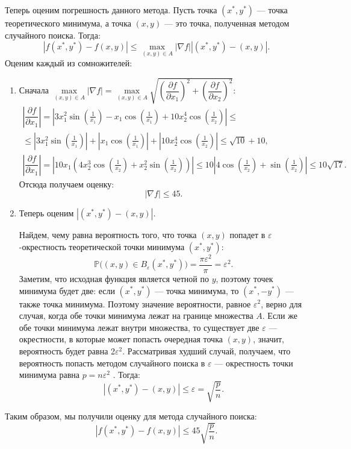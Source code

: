 \documentclass[oneside, final, 12pt]{article}
\begin{document}
	Теперь оценим погрешность данного метода. Пусть точка $(x^*, y^*)$ --- точка теоретического минимума,
	а точка $(x,y)$ --- это точка, полученная методом случайного поиска. Тогда:
	$$
		|f(x^*,y^*) - f(x,y)| \leqslant \max \limits_{(x,y)\in A}|\nabla f||(x^*,y^*) - (x,y)|.
	$$ 
	\newpage
	Оценим каждый из сомножителей:
	\begin{enumerate}
		\item Сначала $\max \limits_{(x,y)\in A}|\nabla f| =\max\limits_{(x,y)\in A} 
																				\sqrt{\left(\dfrac{\partial f}{\partial x_1}\right)^2 +
																							\left(\dfrac{\partial f}{\partial x_2}\right)^2}:$
				$$
					\begin{gathered}
						\left| \dfrac{\partial f}{\partial x_1}\right| =
					 		\left| 3x_1^2\sin\left(\frac{1}{x_1}\right)- x_1\cos\left(\frac{1}{x_1}\right)
					 					+ 10 x_2^4\cos\left(\frac{1}{x_2}\right) \right| \leqslant\\
					 		\leqslant \left| 3x_1^2\sin\left(\frac{1}{x_1}\right)\right| 
					 							+ \left|x_1\cos\left(\frac{1}{x_1}\right)\right|
					 							+ \left|10 x_2^4\cos\left(\frac{1}{x_2}\right) \right| \leqslant \sqrt{10} + 10, \\
					 	\left| \dfrac{\partial f}{\partial x_1}\right| = 
					 		\left| 10x_1\left(4x_2^3\cos\left(\frac{1}{x_2}\right)
					 				+x_2^2\sin\left(\frac{1}{x_2}\right) \right) \right| \leqslant 
					 				10 \left|4\cos\left(\frac{1}{x_2}\right)
					 						+\sin\left(\frac{1}{x_2}\right)\right| \leqslant 10\sqrt{17}.
					\end{gathered}
				$$
				Отсюда получаем оценку:
				$$
					|\nabla f| \leqslant 45.
				$$ 
		\item Теперь оценим $|(x^*,y^*) - (x,y)|$.
		
				Найдем, чему равна вероятность того, что точка $(x,y)$ попадет в $\varepsilon$-окрестность
				теоретической точки минимума $(x^*,y^*)$:
				$$	
					\mathbb{P} \Big( (x,y) \in B_{\varepsilon}(x^*,y^*)\Big) = \dfrac{\pi \varepsilon^2}{\pi} 
										= \varepsilon^2.
				$$
				Заметим, что исходная функция является четной по $y$, поэтому точек минимума будет
				две: если $(x^*, y^*)$ — точка минимума, то $(x^*,-y^*)$ — также точка минимума. Поэтому
				значение вероятности, равное $\varepsilon^2$, верно для случая, когда обе точки минимума
				лежат на границе множества $A$. Если же обе точки минимума лежат внутри множества,
				то существует две $\varepsilon$ --- окрестности, в которые может попасть очередная точка $(x, y)$, 
				значит, вероятность будет равна 2$\varepsilon^2$. Рассматривая худший случай, получаем, что 
				вероятность попасть методом случайного поиска в $\varepsilon$ --- окрестность точки минимума 
				равна $p=n\varepsilon^2$ . Тогда:
				$$
					|(x^*,y^*) - (x,y)| \leqslant \varepsilon = \sqrt{\dfrac{p}{n}}.
				$$
	\end{enumerate}
	Таким образом, мы получили оценку для метода случайного поиска:
	$$ |f(x^*,y^*) - f(x,y)| \leqslant 45 \sqrt{\dfrac{p}{n}}.$$
	
\end{document}
